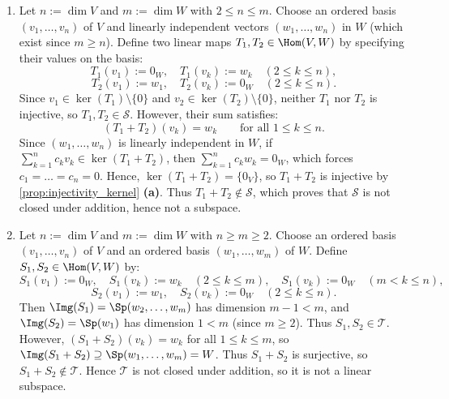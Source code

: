 

\begin{exercisesolution}
\label{sol:hom_non_injective_non_surjective_not_subspaces}
\begin{enumerate}[label=\textbf{(\alph*)}]
    \item Let $n := \dim V$ and $m := \dim W$ with $2 \le n \le m$.
    Choose an ordered basis $(v_1, \dots, v_n)$ of $V$ and linearly independent vectors $(w_1, \dots, w_n)$ in $W$ (which exist since $m \ge n$).
    Define two linear maps $T_1, T_2 \in \Hom(V, W)$ by specifying their values on the basis:
    \[
    T_1(v_1) := 0_W, \quad T_1(v_k) := w_k \quad (2 \le k \le n),
    \]
    \[
    T_2(v_1) := w_1, \quad T_2(v_k) := 0_W \quad (2 \le k \le n).
    \]
    Since $v_1 \in \ker(T_1) \setminus \{0\}$ and $v_2 \in \ker(T_2) \setminus \{0\}$, neither $T_1$ nor $T_2$ is injective, so $T_1, T_2 \in \mathcal{S}$.
    However, their sum satisfies:
    \[
    (T_1 + T_2)(v_k) = w_k \qquad \text{for all } 1 \le k \le n.
    \]
    Since $(w_1, \dots, w_n)$ is linearly independent in $W$, if $\sum_{k=1}^n c_k v_k \in \ker(T_1 + T_2)$, then $\sum_{k=1}^n c_k w_k = 0_W$, which forces $c_1 = \dots = c_n = 0$. Hence, $\ker(T_1 + T_2) = \{0_V\}$, so $T_1 + T_2$ is injective by \cref{prop:injectivity_kernel} \textbf{(a)}.
    Thus $T_1 + T_2 \notin \mathcal{S}$, which proves that $\mathcal{S}$ is not closed under addition, hence not a subspace.

    \item Let $n := \dim V$ and $m := \dim W$ with $n \ge m \ge 2$.
    Choose an ordered basis $(v_1, \dots, v_n)$ of $V$ and an ordered basis $(w_1, \dots, w_m)$ of $W$.
    Define $S_1, S_2 \in \Hom(V, W)$ by:
    \[
    S_1(v_1) := 0_W, \quad S_1(v_k) := w_k \quad (2 \le k \le m), \quad S_1(v_k) := 0_W \quad (m < k \le n),
    \]
    \[
    S_2(v_1) := w_1, \quad S_2(v_k) := 0_W \quad (2 \le k \le n).
    \]
    Then $\Img(S_1) = \Sp(w_2, \dots, w_m)$ has dimension $m-1 < m$, and $\Img(S_2) = \Sp(w_1)$ has dimension $1 < m$ (since $m \ge 2$).
    Thus $S_1, S_2 \in \mathcal{T}$.
    However, $(S_1 + S_2)(v_k) = w_k$ for all $1 \le k \le m$, so $\Img(S_1 + S_2) \supseteq \Sp(w_1, \dots, w_m) = W$.
    Thus $S_1 + S_2$ is surjective, so $S_1 + S_2 \notin \mathcal{T}$.
    Hence $\mathcal{T}$ is not closed under addition, so it is not a linear subspace. \qedhere
\end{enumerate}
\end{exercisesolution}

